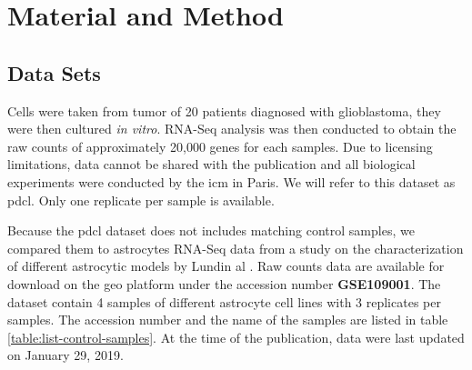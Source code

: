 \section{Material and Method}

\subsection{Data Sets}

Cells were taken from tumor of 20 patients diagnosed with glioblastoma, they were  then cultured \textit{in vitro}.
RNA-Seq analysis was then conducted to obtain the raw counts of approximately 20,000 genes for each samples.
Due to licensing limitations, data cannot be shared with the publication and all biological experiments were conducted by the \acrfull{icm} in Paris.
We will refer to this dataset as \acrfull{pdcl}.
Only one replicate per sample is available.

Because the \acrshort{pdcl} dataset does not includes matching control samples, we compared them to astrocytes RNA-Seq data from a study on the characterization of different astrocytic models by Lundin  al \cite*{Lundin2018}.
Raw counts data are available for download on the \acrfull{geo} platform under the accession number \textbf{GSE109001}.
The dataset contain 4 samples of different astrocyte cell lines with 3 replicates per samples.
The accession number and the name of the samples are listed in table \ref*{table:list-control-samples}.
At the time of the publication, data were last updated on January 29, 2019.

